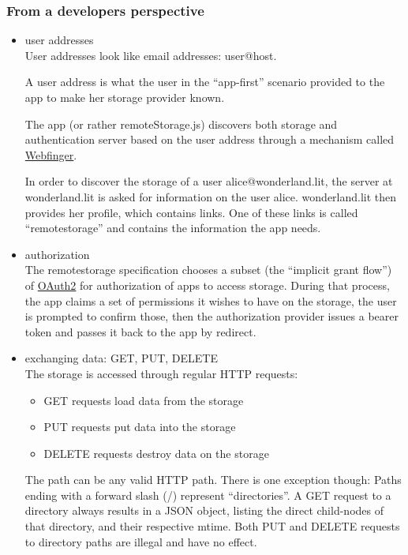\documentclass[11pt]{article}
\begin{document}
\subsubsection{From a developers perspective}
\label{sec-1-3-2}
\begin{itemize}

\item user addresses\\
\label{sec-1-3-2-1}%
User addresses look like email addresses: user@host.

     A user address is what the user in the ``app-first'' scenario provided to the app to make her storage provider known.

     The app (or rather remoteStorage.js) discovers both storage and authentication server based on the user address through a mechanism called \href{http://tools.ietf.org/html/draft-jones-appsawg-webfinger-06}{Webfinger}.

     In order to discover the storage of a user alice@wonderland.lit, the server at wonderland.lit is asked for information on the user alice. wonderland.lit then provides her profile, which contains links. One of these links is called ``remotestorage'' and contains the information the app needs.


\item authorization\\
\label{sec-1-3-2-2}%
The remotestorage specification chooses a subset (the ``implicit grant flow'') of \href{http://oauth.net/2/}{OAuth2} for authorization of apps to access storage.
     During that process, the app claims a set of permissions it wishes to have on the storage, the user is prompted to confirm those, then the authorization provider issues a bearer token and passes it back to the app by redirect.


\item exchanging data: GET, PUT, DELETE\\
\label{sec-1-3-2-3}%
The storage is accessed through regular HTTP requests:
\begin{itemize}
\item GET requests load data from the storage
\item PUT requests put data into the storage
\item DELETE requests destroy data on the storage
\end{itemize}

     The path can be any valid HTTP path. There is one exception though: Paths ending with a forward slash (/) represent ``directories''.
     A GET request to a directory always results in a JSON object, listing the direct child-nodes of that directory, and their respective mtime.
     Both PUT and DELETE requests to directory paths are illegal and have no effect.


\end{itemize}
\end{document}
